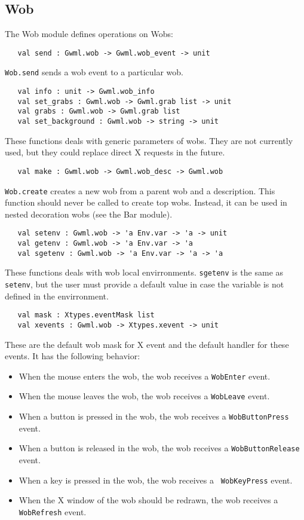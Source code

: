 \documentclass{book}
\begin{document}
   \subsection{\bf Wob}

The Wob module defines operations on Wobs:

\begin{verbatim}
   val send : Gwml.wob -> Gwml.wob_event -> unit 
\end{verbatim}
  {\tt Wob.send} sends a wob event to a particular wob.

\begin{verbatim}
   val info : unit -> Gwml.wob_info
   val set_grabs : Gwml.wob -> Gwml.grab list -> unit
   val grabs : Gwml.wob -> Gwml.grab list
   val set_background : Gwml.wob -> string -> unit
\end{verbatim}

These functions deals with generic parameters of wobs. They are not currently
used, but they could replace direct X requests in the future.

\begin{verbatim}
   val make : Gwml.wob -> Gwml.wob_desc -> Gwml.wob 
\end{verbatim}
  {\tt Wob.create} creates a new wob from a parent wob and a description.
This function should never be called to create top wobs. Instead, it can 
be used in nested decoration wobs (see the Bar module).

\begin{verbatim}
   val setenv : Gwml.wob -> 'a Env.var -> 'a -> unit
   val getenv : Gwml.wob -> 'a Env.var -> 'a
   val sgetenv : Gwml.wob -> 'a Env.var -> 'a -> 'a
\end{verbatim}
  These functions deals with wob local envirronments. {\tt sgetenv} is the 
same as {\tt setenv}, but the user must provide a default value in
case the variable is not defined in the envirronment.

\begin{verbatim}
   val mask : Xtypes.eventMask list
   val xevents : Gwml.wob -> Xtypes.xevent -> unit
\end{verbatim}
  These are the default wob mask for X event and the default handler for 
these events. It has the following behavior:

\begin{itemize}
\item When the mouse enters the wob, the wob receives a {\tt WobEnter} event.
\item When the mouse leaves the wob, the wob receives a {\tt WobLeave} event.
\item When a button is pressed in the wob, the wob receives a {\tt WobButtonPress} event.
\item When a button is released in the wob, the wob receives a {\tt WobButtonRelease} event.
\item When a key is pressed in the wob, the wob receives a {\tt 
WobKeyPress} event.
\item When the X window of the wob should be redrawn, the wob receives a {
\tt WobRefresh} event.
\end{itemize}
\end{document}
